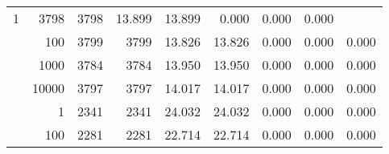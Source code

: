 \begin{table}
\begin{tabular}{rrrrrrrrr}
					\multirow{ 1 }{*}{ 1 } &
					
						
							    
							     3798  & 3798  
	                           & 13.899 & 13.899 & 0.000
	                           & 0.000 & 0.000  \\
	                
	            
					 &  
					 
					\multirow{ 1 }{*}{ 100 } &
					
						
							    
							     3799  & 3799  
	                           & 13.826 & 13.826 & 0.000
	                           & 0.000 & 0.000  \\
	                
	            
					 &  
					 
					\multirow{ 1 }{*}{ 1000 } &
					
						
							    
							     3784  & 3784  
	                           & 13.950 & 13.950 & 0.000
	                           & 0.000 & 0.000  \\
	                
	            
					 &  
					 
					\multirow{ 1 }{*}{ 10000 } &
					
						
							    
							     3797  & 3797  
	                           & 14.017 & 14.017 & 0.000
	                           & 0.000 & 0.000  \\
	                
	            
	        
				\noalign{\smallskip}\hline
				\multirow{ 4 }{*}{ 2000000 } &
				
					
					 
					\multirow{ 1 }{*}{ 1 } &
					
						
							    
							     2341  & 2341  
	                           & 24.032 & 24.032 & 0.000
	                           & 0.000 & 0.000  \\
	                
	            
					 &  
					 
					\multirow{ 1 }{*}{ 100 } &
					
						
							    
							     2281  & 2281  
	                           & 22.714 & 22.714 & 0.000
	                           & 0.000 & 0.000  \\
	                

\end{tabular}
\end{table}
